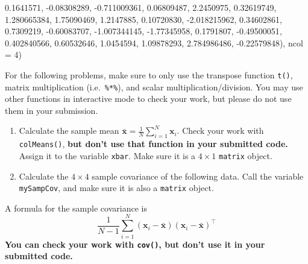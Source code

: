 \documentclass[12pt,krantz2]{krantz}
\makeatletter
\newenvironment{Shaded}{\begin{snugshade}}{\end{snugshade}}
\newcommand{\DataTypeTok}[1]{\textcolor[rgb]{0.27,0.27,0.27}{#1}}
\newcommand{\DecValTok}[1]{\textcolor[rgb]{0.06,0.06,0.06}{#1}}
\newcommand{\FloatTok}[1]{\textcolor[rgb]{0.06,0.06,0.06}{#1}}
\newcommand{\NormalTok}[1]{#1}
\newenvironment{kframe}{%
\medskip{}
\setlength{\fboxsep}{.8em}
 \def\at@end@of@kframe{}%
 \ifinner\ifhmode%
  \def\at@end@of@kframe{\end{minipage}}%
  \begin{minipage}{\columnwidth}%
 \fi\fi%
 \def\FrameCommand##1{\hskip\@totalleftmargin \hskip-\fboxsep
 \colorbox{shadecolor}{##1}\hskip-\fboxsep
     \hskip-\linewidth \hskip-\@totalleftmargin \hskip\columnwidth}%
 \MakeFramed {\advance\hsize-\width
   \@totalleftmargin\z@ \linewidth\hsize
   \@setminipage}}%
 {\par\unskip\endMakeFramed%
 \at@end@of@kframe}
\renewenvironment{Shaded}{\begin{kframe}}{\end{kframe}}
\makeatother
\begin{document}
\begin{Shaded}
\begin{Highlighting}[]
  \FloatTok{0.1641571}\NormalTok{, }\FloatTok{-0.08308289}\NormalTok{, }\FloatTok{-0.711009361}\NormalTok{,  }\FloatTok{0.06809487}\NormalTok{,}
  \FloatTok{2.2450975}\NormalTok{,  }\FloatTok{0.32619749}\NormalTok{,  }\FloatTok{1.280665384}\NormalTok{,  }\FloatTok{1.75090469}\NormalTok{,}
  \FloatTok{1.2147885}\NormalTok{,  }\FloatTok{0.10720830}\NormalTok{, }\FloatTok{-2.018215962}\NormalTok{,  }\FloatTok{0.34602861}\NormalTok{,}
  \FloatTok{0.7309219}\NormalTok{, }\FloatTok{-0.60083707}\NormalTok{, }\FloatTok{-1.007344145}\NormalTok{, }\FloatTok{-1.77345958}\NormalTok{,}
  \FloatTok{0.1791807}\NormalTok{, }\FloatTok{-0.49500051}\NormalTok{,  }\FloatTok{0.402840566}\NormalTok{,  }\FloatTok{0.60532646}\NormalTok{,}
  \FloatTok{1.0454594}\NormalTok{,  }\FloatTok{1.09878293}\NormalTok{,  }\FloatTok{2.784986486}\NormalTok{, }\FloatTok{-0.22579848}\NormalTok{), }\DataTypeTok{ncol =} \DecValTok{4}\NormalTok{)}
\end{Highlighting}
\end{Shaded}

For the following problems, make sure to only use the transpose function \texttt{t()}, matrix multiplication (i.e.~\texttt{\%*\%}), and scalar multiplication/division. You may use other functions in interactive mode to check your work, but please do not use them in your submission.

\begin{enumerate}
\def\labelenumi{\alph{enumi}.}
\item
  Calculate the sample mean \(\bar{\mathbf{x}} = \frac{1}{N} \sum_{i=1}^N \mathbf{x}_i\). Check your work with \texttt{colMeans()}, \textbf{but don't use that function in your submitted code.} Assign it to the variable \texttt{xbar}. Make sure it is a \(4 \times 1\) \texttt{matrix} object.
\item
  Calculate the \(4 \times 4\) sample covariance of the following data. Call the variable \texttt{mySampCov}, and make sure it is also a \texttt{matrix} object.
\end{enumerate}

A formula for the sample covariance is
\begin{equation} 
\frac{1}{N-1} \sum_{i=1}^N (\mathbf{x}_i - \bar{\mathbf{x}})(\mathbf{x}_i - \bar{\mathbf{x}})^\intercal
\end{equation}
\textbf{You can check your work with \texttt{cov()}, but don't use it in your submitted code.}
\end{document}
